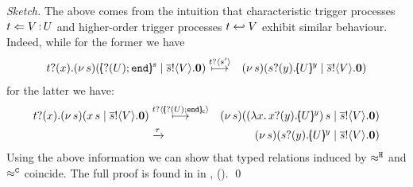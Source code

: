 \begin{proof}[Sketch]
	The above comes from the intuition that
	characteristic trigger processes
	$t \Leftarrow V{\,:\,}U$
	and
	higher-order trigger processes
	$t \hookleftarrow V$
	exhibit similar behaviour.
Indeed, while for the former we have
	\begin{eqnarray*}
		\fotrigger{t}{x}{s}{\btinp{U} \tinact}{V} &\hby{\bactinp{t}{s'}}& \newsp{s}{ \binp{s}{y} \mapchar{U}{y}  \Par \bout{\dual{s}}{V} \inact}
			\end{eqnarray*}
		for the latter we have:
	\begin{eqnarray*}
		\hotrigger{t}{x}{s}{V} &\hby{\bactinp{t}{\omapchar{\btinp{U} \tinact}}}& \newsp{s}{ \appl{(\abs{x}{\binp{x}{y} \mapchar{U}{y}})}{s}  \Par \bout{\dual{s}}{V} \inact}\\
		&\by{\tau}& \newsp{s}{ \binp{s}{y} \mapchar{U}{y}  \Par \bout{\dual{s}}{V} \inact}
	\end{eqnarray*}
%
	Using the above information we can show that typed relations induced by 
	$\approx^\mathtt{H}$ and $\approx^\mathtt{C}$ coincide.
	The full proof is found in 
	in ,  ().
	\qed
\end{proof}

